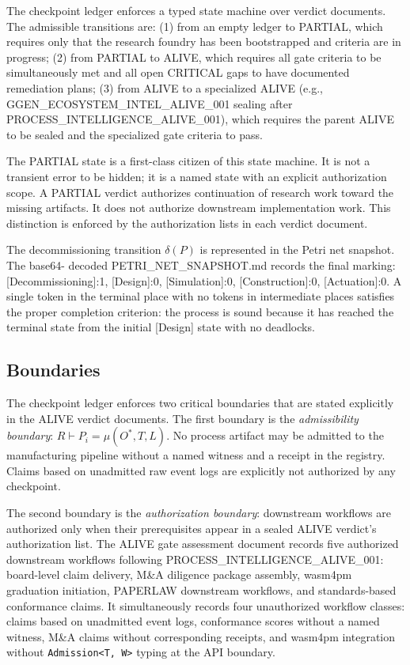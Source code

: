 The checkpoint ledger enforces a typed state machine over verdict documents. The admissible
transitions are: (1) from an empty ledger to PARTIAL, which requires only that the research foundry
has been bootstrapped and criteria are in progress; (2) from PARTIAL to ALIVE, which requires all
gate criteria to be simultaneously met and all open CRITICAL gaps to have documented remediation
plans; (3) from ALIVE to a specialized ALIVE (e.g., GGEN\_ECOSYSTEM\_INTEL\_ALIVE\_001 sealing after
PROCESS\_INTELLIGENCE\_ALIVE\_001), which requires the parent ALIVE to be sealed and the specialized
gate criteria to pass.

The PARTIAL state is a first-class citizen of this state machine. It is not a transient error to be
hidden; it is a named state with an explicit authorization scope. A PARTIAL verdict authorizes
continuation of research work toward the missing artifacts. It does not authorize downstream
implementation work. This distinction is enforced by the authorization lists in each verdict document.

The decommissioning transition $\delta(P)$ is represented in the Petri net snapshot. The base64-
decoded PETRI\_NET\_SNAPSHOT.md records the final marking: [Decommissioning]:1, [Design]:0,
[Simulation]:0, [Construction]:0, [Actuation]:0. A single token in the terminal place with no
tokens in intermediate places satisfies the proper completion criterion: the process is sound because
it has reached the terminal state from the initial [Design] state with no deadlocks.

\subsection{Boundaries}
\label{sec:checkpoints-architecture-boundaries}

The checkpoint ledger enforces two critical boundaries that are stated explicitly in the ALIVE
verdict documents. The first boundary is the \emph{admissibility boundary}: $R \vdash P_i = \mu(O^*, T, L)$.
No process artifact may be admitted to the manufacturing pipeline without a named witness and a receipt
in the registry. Claims based on unadmitted raw event logs are explicitly not authorized by any
checkpoint.

The second boundary is the \emph{authorization boundary}: downstream workflows are authorized only
when their prerequisites appear in a sealed ALIVE verdict's authorization list. The ALIVE gate
assessment document records five authorized downstream workflows following PROCESS\_INTELLIGENCE\_ALIVE\_001:
board-level claim delivery, M\&A diligence package assembly, wasm4pm graduation initiation, PAPERLAW
downstream workflows, and standards-based conformance claims. It simultaneously records four
unauthorized workflow classes: claims based on unadmitted event logs, conformance scores without a
named witness, M\&A claims without corresponding receipts, and wasm4pm integration without
\texttt{Admission<T, W>} typing at the API boundary.

